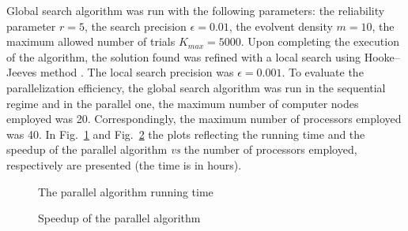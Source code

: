 \documentclass{svproc}
\begin{document}
Global search algorithm was run with the following parameters: the reliability parameter $r=5$, the search precision $\epsilon = 0.01$, the evolvent density $m=10$, the maximum allowed number of trials $K_{max}=5000$. Upon completing the execution of the algorithm, the solution found was refined with a local search using Hooke--Jeeves method \cite{HookJeeves}. The local search precision was $\epsilon = 0.001$. 
To evaluate the parallelization efficiency, the global search algorithm was run in the sequential regime and in the parallel one, the maximum number of computer nodes employed was 20. Correspondingly, the maximum number of processors employed was 40.
In Fig.~\ref{fig_time} and Fig.~\ref{fig_speedup} the plots reflecting the running time and the speedup of the parallel algorithm {\em vs} the number of processors employed, respectively are presented (the time is in hours).


\begin{figure}[ht]
\caption{The parallel algorithm running time}
\label{fig_time}
\end{figure}


\begin{figure}[ht]
\caption{Speedup of the parallel algorithm}
\label{fig_speedup}
\end{figure}
\end{document}
